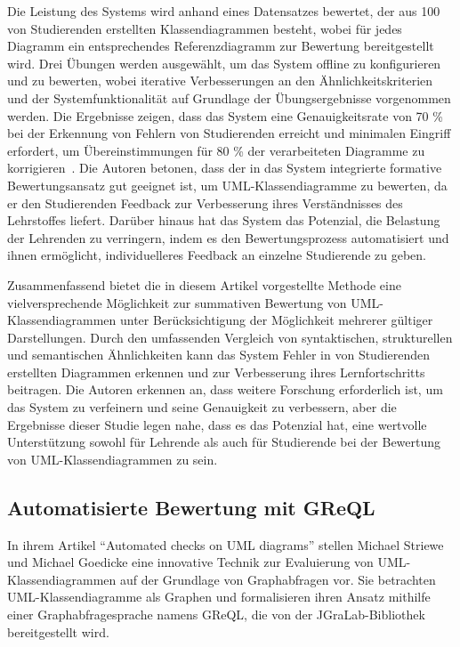 Die Leistung des Systems wird anhand eines Datensatzes bewertet, der aus 100 von Studierenden erstellten
Klassendiagrammen besteht, wobei für jedes Diagramm ein entsprechendes Referenzdiagramm zur Bewertung bereitgestellt
wird. Drei Übungen werden ausgewählt, um das System offline zu konfigurieren und zu bewerten, wobei iterative
Verbesserungen an den Ähnlichkeitskriterien und der Systemfunktionalität auf Grundlage der Übungsergebnisse vorgenommen
werden. Die Ergebnisse zeigen, dass das System eine Genauigkeitsrate von 70 \% bei der Erkennung von Fehlern von
Studierenden erreicht und minimalen Eingriff erfordert, um Übereinstimmungen für 80 \% der verarbeiteten Diagramme zu
korrigieren~\cite{anas2021new}. Die Autoren betonen, dass der in das System integrierte formative Bewertungsansatz gut
geeignet ist, um UML-Klassendiagramme zu bewerten, da er den Studierenden Feedback zur Verbesserung ihres Verständnisses
des Lehrstoffes liefert. Darüber hinaus hat das System das Potenzial, die Belastung der Lehrenden zu verringern, indem
es den Bewertungsprozess automatisiert und ihnen ermöglicht, individuelleres Feedback an einzelne Studierende zu geben.

Zusammenfassend bietet die in diesem Artikel vorgestellte Methode eine vielversprechende Möglichkeit zur summativen
Bewertung von UML-Klassendiagrammen unter Berücksichtigung der Möglichkeit mehrerer gültiger Darstellungen. Durch den
umfassenden Vergleich von syntaktischen, strukturellen und semantischen Ähnlichkeiten kann das System Fehler in von
Studierenden erstellten Diagrammen erkennen und zur Verbesserung ihres Lernfortschritts beitragen. Die Autoren erkennen
an, dass weitere Forschung erforderlich ist, um das System zu verfeinern und seine Genauigkeit zu verbessern, aber die
Ergebnisse dieser Studie legen nahe, dass es das Potenzial hat, eine wertvolle Unterstützung sowohl für Lehrende als
auch für Studierende bei der Bewertung von UML-Klassendiagrammen zu sein.

\subsection{Automatisierte Bewertung mit GReQL}\label{subsec:automatisierte-bewertung-mit-greql}

In ihrem Artikel ``Automated checks on UML diagrams'' \cite{striewe2011automated} stellen Michael Striewe und Michael Goedicke eine innovative Technik zur Evaluierung von UML-Klassendiagrammen auf der Grundlage von Graphabfragen vor. Sie betrachten UML-Klassendiagramme als Graphen und formalisieren ihren Ansatz mithilfe einer Graphabfragesprache namens GReQL, die von der JGraLab-Bibliothek bereitgestellt wird.

